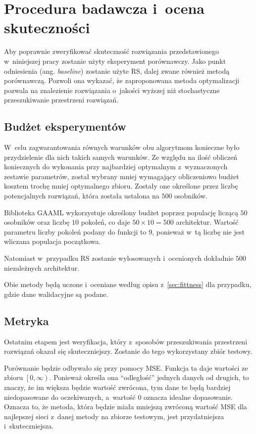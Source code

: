 \section{Procedura badawcza i~ocena skuteczności}
Aby poprawnie zweryfikować skuteczność
rozwiązania przedstawionego w~niniejszej
pracy zostanie użyty eksperyment porównawczy.
Jako punkt odniesienia (ang. \textit{baseline}) zostanie
użyte \gls{RS}, dalej zwane również metodą porównawczą.
Pozwoli ona wykazać, że zaproponowana metoda optymalizacji
pozwala na znalezienie rozwiązania o~jakości wyższej
niż stochastyczne przeszukiwanie przestrzeni rozwiązań.   

\subsection{Budżet eksperymentów}
W~celu zagwarantowania równych warunków
obu algorytmom konieczne było przydzielenie
dla nich takich samych warunków.
Ze względu na ilość obliczeń koniecznych do wykonania przy
najbardziej optymalnym z~wyznaczonych zestawie parametrów,
został wybrany mniej wymagający obliczeniowo
budżet kosztem trochę mniej optymalnego zbioru.
Zostały one określone przez liczbę potencjalnych rozwiązań,
która została ustalona na $500$ osobników.

Biblioteka \gls{GAAML} wykorzystuje określony budżet poprzez
populację liczącą $50$ osobników oraz liczbę $10$ pokoleń,
co daje $50 \times 10 = 500$ architektur.
Wartość parametru liczby pokoleń podany do funkcji to $9$,
ponieważ w~tą liczbę nie jest wliczana populacja początkowa.

Natomiast w~przypadku \gls{RS} zostanie wylosowanych
i~ocenionych dokładnie $500$ niezależnych architektur.

Obie metody będą uczone i~oceniane według
opisu z~\cref{sec:fittness} dla przypadku,
gdzie dane walidacyjne są podane.

\subsection{Metryka}
Ostatnim etapem jest weryfikacja,
który z~sposobów przeszukiwania przestrzeni
rozwiązań okazał się skuteczniejszy.
Zostanie do tego wykorzystany zbiór testowy.

Porównanie będzie odbywało się przy pomocy \gls{MSE}.
Funkcja ta daje wartości ze zbioru $\left[0, \infty\right)$.
Ponieważ określa ona ``odległość''
jednych danych od drugich, to znaczy,
że im większa będzie wartość zwrócona,
tym dane te będą bardziej niedopasowane do oczekiwanych,
a~wartość $0$ oznacza idealne dopasowanie.
Oznacza to, że metoda, która będzie miała mniejszą zwróconą
wartość \gls{MSE} dla najlepszej sieci z~danej metody na
zbiorze testowym, jest przydatniejsza i~skuteczniejsza.

